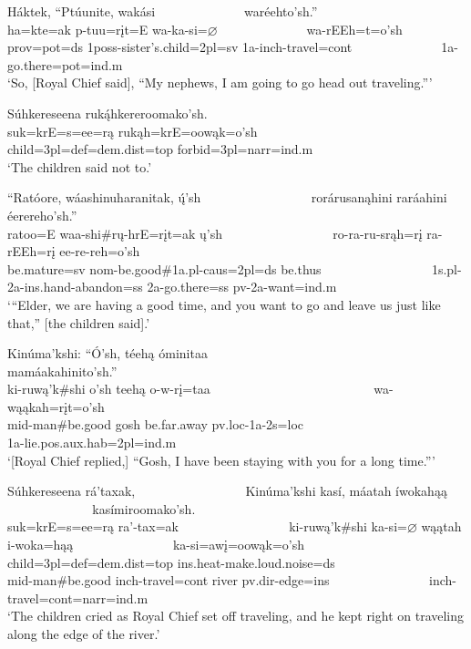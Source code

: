 \begin{exe}
\item\label{EJ38} \glll Háktek, ``Ptúunite, wakási ~ ~ ~ ~ ~ ~ ~ ~ waréehto'sh.''\\
ha=kte=ak p-tuu=rįt=E wa-ka-si=$\varnothing$ ~ ~ ~ ~ ~ ~ ~ ~ wa-rEEh=t=o'sh\\
prov=pot=ds 1poss-\textnormal{sister's.child}=2pl=sv 1a-inch-\textnormal{travel}=cont ~ ~ ~ ~ ~ ~ ~ ~ 1a-\textnormal{go.there}=pot=ind.m\\
\glt `So, [Royal Chief said], ``My nephews, I am going to go head out traveling.{''}'

\item\label{EJ39} \glll Súhkereseena ruką́hkereroomako'sh.\\
suk=krE=s=ee=rą rukąh=krE=oowąk=o'sh\\
\textnormal{child}=3pl=def=dem.dist=top \textnormal{forbid}=3pl=narr=ind.m\\
\glt `The children said not to.'

\item\label{EJ40} \glll ``Ratóore, wáashinuharanitak, ų́'sh ~ ~ ~ ~ ~ ~ ~ ~ ~ ~ rorárusanąhini raráahini éerereho'sh.''\\
ratoo=E waa-shi\#rų-hrE=rįt=ak ų'sh ~ ~ ~ ~ ~ ~ ~ ~ ~ ~ ro-ra-ru-srąh=rį ra-rEEh=rį ee-re-reh=o'sh\\
\textnormal{be.mature}=sv nom-\textnormal{be.good}\#1a.pl-caus=2pl=ds \textnormal{be.thus} ~ ~ ~ ~ ~ ~ ~ ~ ~ ~ 1s.pl-2a-ins.hand-\textnormal{abandon}=ss 2a-\textnormal{go.there}=ss pv-2a-\textnormal{want}=ind.m\\
\glt `{``}Elder, we are having a good time, and you want to go and leave us just like that,{''} [the children said].'

\item\label{EJ41} \glll Kinúma'kshi: ``Ó'sh, téehą  óminitaa ~ ~ ~ ~ ~ ~ ~ ~ ~ ~ ~ ~ ~ ~ ~ mamáakahinito'sh.''\\
ki-ruwą'k\#shi o'sh teehą o-w-rį=taa ~ ~ ~ ~ ~ ~ ~ ~ ~ ~ ~ ~ ~ ~ ~ wa-wąąkah=rįt=o'sh\\
mid-\textnormal{man}\#\textnormal{be.good} \textnormal{gosh} \textnormal{be.far.away} pv.loc-1a-2s=loc ~ ~ ~ ~ ~ ~ ~ ~ ~ ~ ~ ~ ~ ~ ~ 1a-\textnormal{lie}.pos.aux.hab=2pl=ind.m\\
\glt `[Royal Chief replied,] ``Gosh, I have been staying with you for a long time.{''}'

\item\label{EJ42} \glll Súhkereseena rá'taxak, ~ ~ ~ ~ ~ ~ ~ ~ ~ ~ Kinúma'kshi kasí, máatah íwokahąą ~ ~ ~ ~ ~ ~ ~ ~ ~ kasímiroomako'sh.\\
suk=krE=s=ee=rą ra'-tax=ak ~ ~ ~ ~ ~ ~ ~ ~ ~ ~ ki-ruwą'k\#shi ka-si=$\varnothing$ wąątah i-woka=hąą ~ ~ ~ ~ ~ ~ ~ ~ ~ ka-si=awį=oowąk=o'sh\\
\textnormal{child}=3pl=def=dem.dist=top ins.heat-\textnormal{make.loud.noise}=ds ~ ~ ~ ~ ~ ~ ~ ~ ~ ~ mid-\textnormal{man}\#\textnormal{be.good} inch-\textnormal{travel}=cont \textnormal{river} pv.dir-\textnormal{edge}=ins ~ ~ ~ ~ ~ ~ ~ ~ ~ inch-\textnormal{travel}=cont=narr=ind.m\\
\glt `The children cried as Royal Chief set off traveling, and he kept right on traveling along the edge of the river.'


\end{exe}
